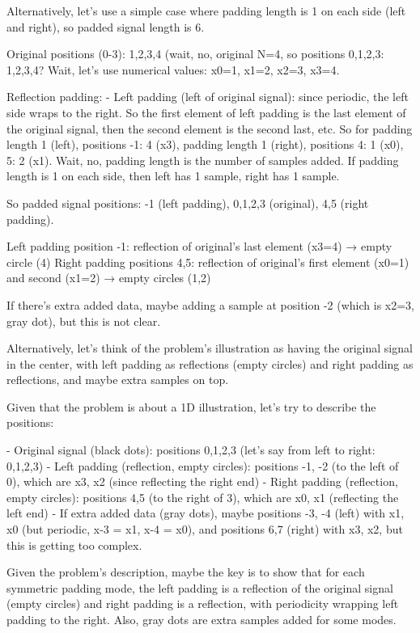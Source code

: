 Alternatively, let's use a simple case where padding length is 1 on each side (left and right), so padded signal length is 6.

Original positions (0-3): 1,2,3,4 (wait, no, original N=4, so positions 0,1,2,3: 1,2,3,4? Wait, let's use numerical values: x0=1, x1=2, x2=3, x3=4.

Reflection padding:
- Left padding (left of original signal): since periodic, the left side wraps to the right. So the first element of left padding is the last element of the original signal, then the second element is the second last, etc. So for padding length 1 (left), positions -1: 4 (x3), padding length 1 (right), positions 4: 1 (x0), 5: 2 (x1). Wait, no, padding length is the number of samples added. If padding length is 1 on each side, then left has 1 sample, right has 1 sample.

So padded signal positions: -1 (left padding), 0,1,2,3 (original), 4,5 (right padding).

Left padding position -1: reflection of original's last element (x3=4) → empty circle (4)
Right padding positions 4,5: reflection of original's first element (x0=1) and second (x1=2) → empty circles (1,2)

If there's extra added data, maybe adding a sample at position -2 (which is x2=3, gray dot), but this is not clear.

Alternatively, let's think of the problem's illustration as having the original signal in the center, with left padding as reflections (empty circles) and right padding as reflections, and maybe extra samples on top.

Given that the problem is about a 1D illustration, let's try to describe the positions:

- Original signal (black dots): positions 0,1,2,3 (let's say from left to right: 0,1,2,3)
- Left padding (reflection, empty circles): positions -1, -2 (to the left of 0), which are x3, x2 (since reflecting the right end)
- Right padding (reflection, empty circles): positions 4,5 (to the right of 3), which are x0, x1 (reflecting the left end)
- If extra added data (gray dots), maybe positions -3, -4 (left) with x1, x0 (but periodic, x-3 = x1, x-4 = x0), and positions 6,7 (right) with x3, x2, but this is getting too complex.

Given the problem's description, maybe the key is to show that for each symmetric padding mode, the left padding is a reflection of the original signal (empty circles) and right padding is a reflection, with periodicity wrapping left padding to the right. Also, gray dots are extra samples added for some modes.

